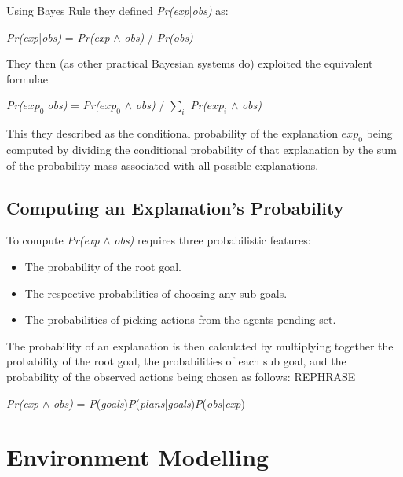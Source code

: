 \documentclass[parskip]{cs4rep}
\begin{document}
Using Bayes Rule they defined \textit{Pr(exp}|\textit{obs)} as:\newline

\centerline{
\textit{Pr(exp}|\textit{obs)} = \textit{Pr(exp} $\wedge$ \textit{obs)} / \textit{Pr(obs)}
}

They then (as other practical Bayesian systems do) exploited the equivalent formulae\newline

\centerline{
\textit{Pr($exp_0$}|\textit{obs)} = \textit{Pr($exp_0$} $\wedge$ \textit{obs)} / $\displaystyle\sum\nolimits_{i}$ \textit{Pr($exp_i$} $\wedge$ \textit{obs)}
}

This they described as the conditional probability of the explanation $exp_0$ being computed by dividing the conditional probability of that explanation by the sum of the probability mass associated with all possible explanations.

\subsection{Computing an Explanation's Probability}

To compute \textit{Pr(exp} $\wedge$ \textit{obs)} requires three probabilistic features:\newline

\begin{itemize}
\item
The probability of the root goal.
\item
The respective probabilities of choosing any sub-goals.
\item
The probabilities of picking actions from the agents pending set.\newline
\end{itemize}

The probability of an explanation is then calculated by multiplying together the probability of the root goal, the probabilities of each sub goal, and the probability of the observed actions being chosen as follows: REPHRASE\newline

\centerline{
\textit{Pr(exp} $\wedge$ \textit{obs)} = \textit{P}(\textit{goals})\textit{P}(\textit{plans}|\textit{goals})\textit{P}(\textit{obs}|\textit{exp})
}

\section{Environment Modelling}
\end{document}
